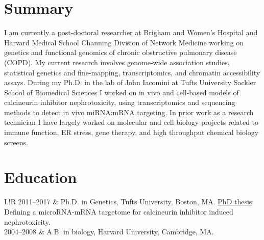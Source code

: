 \documentclass[a4paper, 10pt]{article}
\newcommand\VRule{\color{lightgray}\vrule width 0.5pt}
\begin{document}
\section*{Summary}

I am currently a post-doctoral researcher at Brigham and Women's Hospital and Harvard Medical School Channing Division of Network Medicine working on genetics and functional genomics of chronic obstructive pulmonary disease (COPD). My current research involves genome-wide association studies, statistical genetics and fine-mapping, transcriptomics, and chromatin accessibility assays.  During my Ph.D. in the lab of John Iacomini at Tufts University Sackler School of Biomedical Sciences I worked on in vivo and cell-based models of calcineurin inhibitor nephrotoxicity, using transcriptomics and sequencing methods to detect in vivo miRNA:mRNA targeting. In prior work as a research technician I have largely worked on molecular and cell biology projects related to immune function, ER stress, gene therapy, and high throughput chemical biology screens. 


\section*{Education}
\begin{tabular}{L!{\VRule}R}
   2011--2017 & Ph.D. in Genetics, Tufts University, Boston, MA. \href{https://github.com/cbenway/cv/blob/master/phd_thesis.pdf}{PhD thesis}: Defining a microRNA-mRNA targetome for calcineurin inhibitor induced nephrotoxicity. \\
   2004--2008 & A.B. in biology, Harvard University, Cambridge, MA.
\end{tabular}
\end{document}
